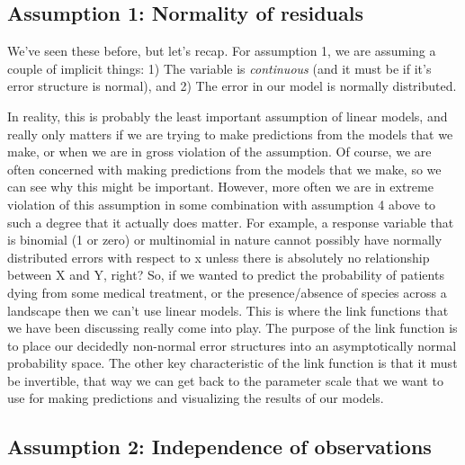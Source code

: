 \documentclass[
]{book}
\begin{document}
\hypertarget{normality-14}{%
\subsection{Assumption 1: Normality of residuals}\label{normality-14}}

We've seen these before, but let's recap. For assumption 1, we are assuming a couple of implicit things: 1) The variable is \emph{continuous} (and it must be if it's error structure is normal), and 2) The error in our model is normally distributed.

In reality, this is probably the least important assumption of linear models, and really only matters if we are trying to make predictions from the models that we make, or when we are in gross violation of the assumption. Of course, we are often concerned with making predictions from the models that we make, so we can see why this might be important. However, more often we are in extreme violation of this assumption in some combination with assumption 4 above to such a degree that it actually does matter. For example, a response variable that is binomial (1 or zero) or multinomial in nature cannot possibly have normally distributed errors with respect to x unless there is absolutely no relationship between X and Y, right? So, if we wanted to predict the probability of patients dying from some medical treatment, or the presence/absence of species across a landscape then we can't use linear models. This is where the link functions that we have been discussing really come into play. The purpose of the link function is to place our decidedly non-normal error structures into an asymptotically normal probability space. The other key characteristic of the link function is that it must be invertible, that way we can get back to the parameter scale that we want to use for making predictions and visualizing the results of our models.

\hypertarget{independence-14}{%
\subsection{Assumption 2: Independence of observations}\label{independence-14}}
\end{document}
